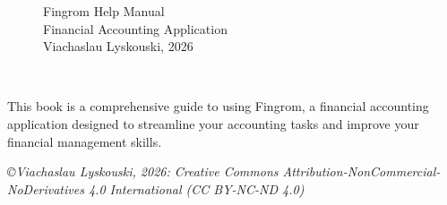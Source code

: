 
\thispagestyle{empty}

\begin{figure}
  \begin{minipage}{0.59\textwidth}
    \large Fingrom Help Manual\\
    \vspace{9mm}
    \noindent \small Financial Accounting Application\\
    \vspace{10mm}
    Viachaslau Lyskouski, 2026\\
    \vspace{2mm}
  \end{minipage}
  \hfill
\end{figure}
~
\vspace{2cm}

\noindent This book is a comprehensive guide to using Fingrom, a financial accounting
application designed to streamline your accounting tasks and improve your financial
management skills.

\vspace{1cm}

\noindent \emph{\small \copyright Viachaslau Lyskouski, 2026: Creative Commons Attribution-NonCommercial-NoDerivatives
4.0 International (CC BY-NC-ND 4.0)}

\newpage
\thispagestyle{empty}
~